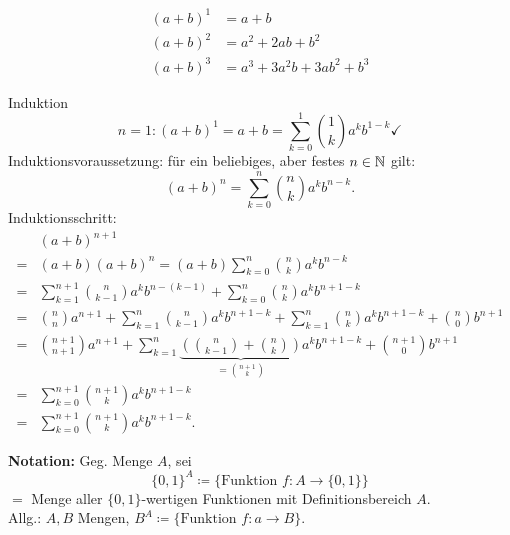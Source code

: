 \documentclass[../ana1.tex]{subfiles}
\begin{document}
\begin{bem}
	\begin{align}
		{(a+b)}^1 & = a+b                     \\
		{(a+b)}^2 & = a^2 + 2ab + b^2         \\
		{(a+b)}^3 & = a^3 +3a^2b + 3ab^2 +b^3
	\end{align}
\end{bem}
\begin{bew} Induktion
	\[ n=1: {(a+b)}^1 = a+b = \sum_{k=0}^{1}\binom{1}{k} a^k b^{1-k} \checkmark{} \]
	Induktionsvoraussetzung: für ein beliebiges, aber festes \(n \in\mathbb{N} \) gilt:
	\[ {(a+b)}^n = \sum_{k=0}^{n} \binom{n}{k} a^k b^{n-k}. \]
	Induktionsschritt:
	\begin{align*}
		 &{(a+b)}^{n+1} \\
		=& (a+b) {(a+b)}^n = (a+b) \sum_{k=0}^{n} \binom{n}{k} a^k b^{n-k} \\
		=& \sum_{k=1}^{n+1} \binom{n}{k-1} a^k b^{n-(k-1)} + \sum_{k=0}^{n} \binom{n}{k} a^k b^{n+1-k} \\
		=& \binom{n}{n} a^{n+1} + \sum_{k=1}^{n} \binom{n}{k-1} a^k b^{n+1-k} + \sum_{k=1}^{n} \binom{n}{k} a^k b^{n+1-k} + \binom{n}{0} b^{n+1} \\
		=& \binom{n+1}{n+1} a^{n+1} + \sum_{k=1}^{n} \underbrace{\left(\binom{n}{k-1} + \binom{n}{k}\right)}_{=\binom{n+1}{k}} a^k b^{n+1-k} + \binom{n+1}{0} b^{n+1} \\
		=& \sum_{k=0}^{n+1} \binom{n+1}{k} a^k b^{n+1-k} \\
		=& \sum_{k=0}^{n+1} \binom{n+1}{k} a^k b^{n+1-k}.
	\end{align*}
\end{bew}

\textbf{Notation:} Geg. Menge \(A \), sei \[ \{0,1\}^A \coloneqq \{ \text{Funktion }f:A\rightarrow \{0,1\} \} \] \(= \) Menge aller \(\{0,1\} \)-wertigen Funktionen mit Definitionsbereich \(A \). \\
Allg.: \(A,B \) Mengen, \(B^A \coloneqq \{ \text{Funktion } f: a\rightarrow B\} \).
\end{document}
